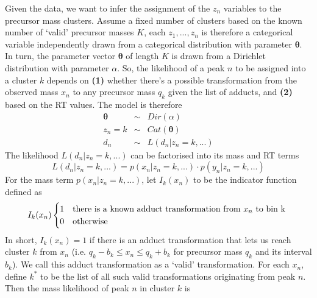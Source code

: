 \documentclass[12pt,a4paper]{article}
\begin{document}
Given the data, we want to infer the assignment of the $z_{n}$ variables to the precursor mass clusters. Assume a fixed number of clusters based on the known number of `valid' precursor masses $K$, each $z_{1},...,z_{n}$ is therefore a categorical variable independently drawn from a categorical distribution with parameter $\boldsymbol{\theta}$. In turn, the parameter vector $\boldsymbol{\theta}$ of length $K$ is drawn from a Dirichlet distribution with parameter $\alpha$. So, the likelihood of a peak $n$ to be assigned into a cluster $k$ depends on \textbf{(1)} whether there's a possible transformation from the observed mass $x_{n}$ to any precursor mass $q_{k}$ given the list of adducts, and \textbf{(2)} based on the RT values. The model is therefore
\begin{eqnarray}
\boldsymbol{\theta} & \sim & Dir(\alpha)\\
z_{n}=k & \sim & Cat(\boldsymbol{\theta})\\
d_{n} & \sim & L(d_{n}|z_{n}=k,...)
\end{eqnarray}
The likelihood $L(d_{n}|z_{n}=k,...)$ can be factorised into its mass and RT terms
\begin{equation}
L(d_{n}|z_{n}=k,...)=p(x_{n}|z_{n}=k,...)\cdot p(y_{n}|z_{n}=k,...)
\end{equation}
For the mass term $p(x_{n}|z_{n}=k,...)$, let $I_{k}(x_{n})$ to be the indicator function defined as
\begin{equation}
I_{k}(x_{n})\begin{cases}
1 & \textnormal{there is a known adduct transformation from \ensuremath{x_{n}} to bin k }\\
0 & \textnormal{otherwise}
\end{cases}
\end{equation}
In short, $I_{k}(x_{n})=1$ if there is an adduct transformation that lets us reach cluster $k$ from $x_{n}$ (i.e. $q_{k}-b_{k}\leq x_{n}\leq q_{k}+b_{k}$ for precursor mass $q_{k}$ and its interval $b_{k}$). We call this adduct transformation as a `valid' transformation. For each $x_{n}$, define $k^{*}$ to be the list of all such valid transformations originating from peak $n$. Then the mass likelihood of peak $n$ in cluster $k$ is
\end{document}
